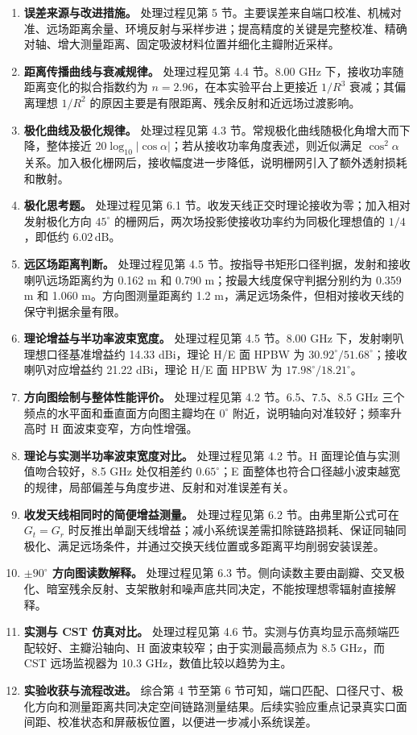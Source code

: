 \documentclass{ctexart}
\begin{document}
\begin{enumerate}
  \item \textbf{误差来源与改进措施。} 处理过程见第 5 节。主要误差来自端口校准、机械对准、远场距离余量、环境反射与采样步进；提高精度的关键是完整校准、精确对轴、增大测量距离、固定吸波材料位置并细化主瓣附近采样。
  \item \textbf{距离传播曲线与衰减规律。} 处理过程见第 4.4 节。8.00 GHz 下，接收功率随距离变化的拟合指数约为 $n=2.96$，在本实验平台上更接近 $1/R^3$ 衰减；其偏离理想 $1/R^2$ 的原因主要是有限距离、残余反射和近远场过渡影响。
  \item \textbf{极化曲线及极化规律。} 处理过程见第 4.3 节。常规极化曲线随极化角增大而下降，整体接近 $20\log_{10}|\cos\alpha|$；若从接收功率角度表述，则近似满足 $\cos^2\alpha$ 关系。加入极化栅网后，接收幅度进一步降低，说明栅网引入了额外透射损耗和散射。
  \item \textbf{极化思考题。} 处理过程见第 6.1 节。收发天线正交时理论接收为零；加入相对发射极化方向 $45^\circ$ 的栅网后，两次场投影使接收功率约为同极化理想值的 $1/4$，即低约 $6.02\,\mathrm{dB}$。
  \item \textbf{远区场距离判断。} 处理过程见第 4.5 节。按指导书矩形口径判据，发射和接收喇叭远场距离约为 0.162 m 和 0.790 m；按最大线度保守判据分别约为 0.359 m 和 1.060 m。方向图测量距离约 1.2 m，满足远场条件，但相对接收天线的保守判据余量有限。
  \item \textbf{理论增益与半功率波束宽度。} 处理过程见第 4.5 节。8.00 GHz 下，发射喇叭理想口径基准增益约 14.33 dBi，理论 H/E 面 HPBW 为 $30.92^\circ/51.68^\circ$；接收喇叭对应增益约 21.22 dBi，理论 H/E 面 HPBW 为 $17.98^\circ/18.21^\circ$。
  \item \textbf{方向图绘制与整体性能评价。} 处理过程见第 4.2 节。6.5、7.5、8.5 GHz 三个频点的水平面和垂直面方向图主瓣均在 $0^\circ$ 附近，说明轴向对准较好；频率升高时 H 面波束变窄，方向性增强。
  \item \textbf{理论与实测半功率波束宽度对比。} 处理过程见第 4.2 节。H 面理论值与实测值吻合较好，8.5 GHz 处仅相差约 $0.65^\circ$；E 面整体也符合口径越小波束越宽的规律，局部偏差与角度步进、反射和对准误差有关。
  \item \textbf{收发天线相同时的简便增益测量。} 处理过程见第 6.2 节。由弗里斯公式可在 $G_t=G_r$ 时反推出单副天线增益；减小系统误差需扣除链路损耗、保证同轴同极化、满足远场条件，并通过交换天线位置或多距离平均削弱安装误差。
  \item \textbf{$\pm90^\circ$ 方向图读数解释。} 处理过程见第 6.3 节。侧向读数主要由副瓣、交叉极化、暗室残余反射、支架散射和噪声底共同决定，不能按理想零辐射直接解释。
  \item \textbf{实测与 CST 仿真对比。} 处理过程见第 4.6 节。实测与仿真均显示高频端匹配较好、主瓣沿轴向、H 面波束较窄；由于实测最高频点为 8.5 GHz，而 CST 远场监视器为 10.3 GHz，数值比较以趋势为主。
  \item \textbf{实验收获与流程改进。} 综合第 4 节至第 6 节可知，端口匹配、口径尺寸、极化方向和测量距离共同决定空间链路测量结果。后续实验应重点记录真实口面间距、校准状态和屏蔽板位置，以便进一步减小系统误差。
\end{enumerate}
\end{document}

